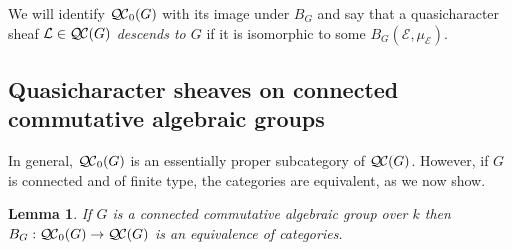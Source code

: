 \documentclass{amsart}
\theoremstyle{plain}
\newtheorem{lemma}[theorem]{Lemma}
\theoremstyle{definition}
\theoremstyle{remark}
\newcommand{\Fq}{k}
\newcommand{\qcs}[1]{{\mathcal{#1}}}
\newcommand{\QC}{{\mathcal{Q\hskip-0.8pt C}}}
\newcommand{\bQC}{{\QC_0}}
\begin{document}
We will identify $\bQC(G)$ with its image under $B_G$ and say that a quasicharacter sheaf $\qcs{L} \in \QC(G)$ \emph{descends to $G$} if it is isomorphic to some $B_G(\qcs{E}, \mu_\qcs{E})$.

\subsection{Quasicharacter sheaves on connected commutative algebraic groups}\label{sec:connected}

In general, $\bQC(G)$ is an essentially
proper subcategory of $\QC(G)$. 
However, if $G$ is connected and of finite type, the categories are equivalent, as we now show.

\begin{lemma}\label{lem:bounded_connected}
If $G$ is a connected commutative algebraic group over $\Fq$ then $B_G : \bQC(G) \to \QC(G)$ is an equivalence of categories.
\end{lemma}
\end{document}
